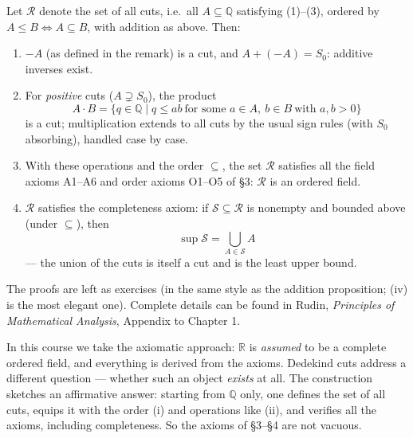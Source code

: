 \documentclass[11pt]{report}
\begin{document}
\begin{propbox}
Let $\mathcal{R}$ denote the set of all cuts, i.e.\ all $A \subseteq \mathbb{Q}$ satisfying (1)--(3), ordered by $A \leq B \iff A \subseteq B$, with addition as above. Then:
\begin{enumerate}[label=(\roman*)]
    \item $-A$ (as defined in the remark) is a cut, and $A + (-A) = S_0$: additive inverses exist.
    \item For \emph{positive} cuts ($A \supsetneq S_0$), the product
    \[
    A \cdot B = \{ q \in \mathbb{Q} \mid q \leq ab \ \text{for some } a \in A,\ b \in B \ \text{with } a, b > 0 \}
    \]
    is a cut; multiplication extends to all cuts by the usual sign rules (with $S_0$ absorbing), handled case by case.
    \item With these operations and the order $\subseteq$, the set $\mathcal{R}$ satisfies all the field axioms A1--A6 and order axioms O1--O5 of \S 3: $\mathcal{R}$ is an ordered field.
    \item $\mathcal{R}$ satisfies the completeness axiom: if $\mathcal{S} \subseteq \mathcal{R}$ is nonempty and bounded above (under $\subseteq$), then
    \[
    \sup \mathcal{S} = \bigcup_{A \in \mathcal{S}} A
    \]
    --- the union of the cuts is itself a cut and is the least upper bound.
\end{enumerate}
The proofs are left as exercises (in the same style as the addition proposition; (iv) is the most elegant one). Complete details can be found in Rudin, \emph{Principles of Mathematical Analysis}, Appendix to Chapter 1.
\end{propbox}

\begin{rembox}
In this course we take the axiomatic approach: $\mathbb{R}$ is \emph{assumed} to be a complete ordered field, and everything is derived from the axioms. Dedekind cuts address a different question --- whether such an object \emph{exists} at all. The construction sketches an affirmative answer: starting from $\mathbb{Q}$ only, one defines the set of all cuts, equips it with the order (i) and operations like (ii), and verifies all the axioms, including completeness. So the axioms of \S 3--\S 4 are not vacuous.
\end{rembox}

\end{document}
